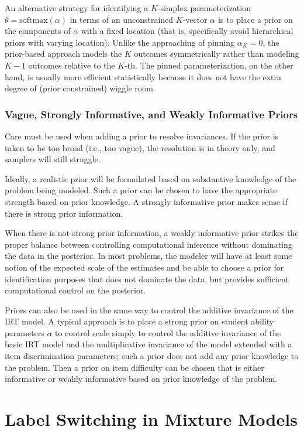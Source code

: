 An alternative strategy for identifying a $K$-simplex parameterization
$\theta = \mbox{softmax}(\alpha)$ in terms of an unconstrained
$K$-vector $\alpha$ is to place a prior on the components of $\alpha$
with a fixed location (that is, specifically avoid hierarchical priors
with varying location).  Unlike the approaching of pinning $\alpha_K =
0$, the prior-based approach models the $K$ outcomes symmetrically
rather than modeling $K-1$ outcomes relative to the $K$-th.  The
pinned parameterization, on the other hand, is usually more efficient
statistically because it does not have the extra degree of (prior
constrained) wiggle room.


\subsubsection{Vague, Strongly Informative, and Weakly Informative Priors}

Care must be used when adding a prior to resolve invariances.  If the
prior is taken to be too broad (i.e., too vague), the resolution is in
theory only, and samplers will still struggle.  

Ideally, a realistic prior will be formulated based on substantive
knowledge of the problem being modeled.  Such a prior can be chosen to
have the appropriate strength based on prior knowledge.  A strongly
informative prior makes sense if there is strong prior information.

When there is not strong prior information, a weakly informative prior
strikes the proper balance between controlling computational inference
without dominating the data in the posterior.  In most problems, the
modeler will have at least some notion of the expected scale of the
estimates and be able to choose a prior for identification purposes
that does not dominate the data, but provides sufficient computational
control on the posterior.

Priors can also be used in the same way to control the additive
invariance of the IRT model.  A typical approach is to place a strong
prior on student ability parameters $\alpha$ to control scale simply
to control the additive invariance of the basic IRT model and the
multiplicative invariance of the model extended with a item
discrimination parameters; such a prior does not add any prior
knowledge to the problem.  Then a prior on item difficulty can be
chosen that is either informative or weakly informative based on prior
knowledge of the problem.


\section{Label Switching in Mixture Models}\label{label-switching-problematic.section}

